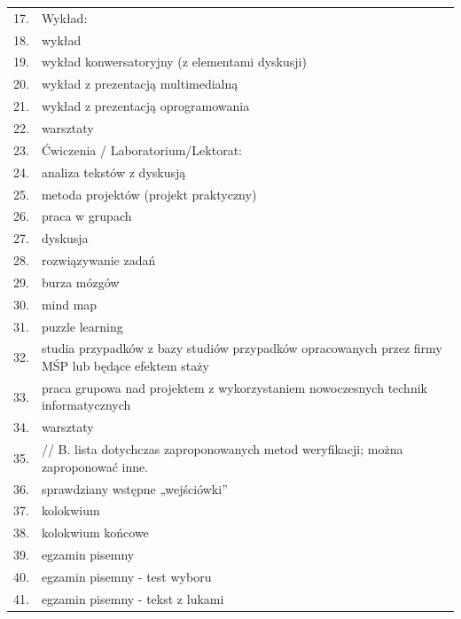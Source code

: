\documentclass[12pt, a4paper]{article}
\begin{document}
{\begin{longtable}{m{1.5cm}m{14.5cm}}
  \rowcolor{tableRowLight} 17. & Wykład: \\
  \rowcolor{tableRowAlt} 18. & wykład \\
  \rowcolor{tableRowLight} 19. & wykład konwersatoryjny (z elementami dyskusji) \\
  \rowcolor{tableRowAlt} 20. & wykład z prezentacją multimedialną \\
  \rowcolor{tableRowLight} 21. & wykład z prezentacją oprogramowania \\
  \rowcolor{tableRowAlt} 22. & warsztaty \\
  \rowcolor{tableRowLight} 23. & Ćwiczenia / Laboratorium/Lektorat: \\
  \rowcolor{tableRowAlt} 24. & analiza tekstów z dyskusją \\
  \rowcolor{tableRowLight} 25. & metoda projektów (projekt praktyczny) \\
  \rowcolor{tableRowAlt} 26. & praca w grupach \\
  \rowcolor{tableRowLight} 27. & dyskusja \\
  \rowcolor{tableRowAlt} 28. & rozwiązywanie zadań \\
  \rowcolor{tableRowLight} 29. & burza mózgów \\
  \rowcolor{tableRowAlt} 30. & mind map \\
  \rowcolor{tableRowLight} 31. & puzzle learning \\
  \rowcolor{tableRowAlt} 32. & studia przypadków z bazy studiów przypadków opracowanych przez firmy MŚP lub będące efektem staży \\
  \rowcolor{tableRowLight} 33. & praca grupowa nad projektem z wykorzystaniem nowoczesnych technik informatycznych \\
  \rowcolor{tableRowAlt} 34. & warsztaty \\
  \rowcolor{tableRowLight} 35. & // B. lista dotychczas zaproponowanych metod weryfikacji; można zaproponować inne. \\
  \rowcolor{tableRowAlt} 36. & sprawdziany wstępne „wejściówki” \\
  \rowcolor{tableRowLight} 37. & kolokwium \\
  \rowcolor{tableRowAlt} 38. & kolokwium końcowe \\
  \rowcolor{tableRowLight} 39. & egzamin pisemny \\
  \rowcolor{tableRowAlt} 40. & egzamin pisemny - test wyboru \\
  \rowcolor{tableRowLight} 41. & egzamin pisemny - tekst z lukami \\

\end{longtable}}
\end{document}
